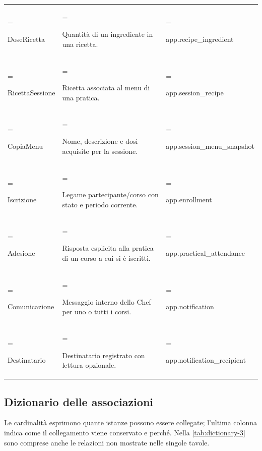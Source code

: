 \documentclass[11pt,a4paper]{article}
\begin{document}
{\begin{xltabular}{\linewidth}{>{\hsize\linewidth=\hsize\raggedright\arraybackslash}X>{\hsize\linewidth=\hsize\raggedright\arraybackslash}X>{\hsize\linewidth=\hsize\raggedright\arraybackslash}X}
DoseRicetta & Quantità di un ingrediente in una ricetta. & {\ttfamily\small app.\allowbreak{}recipe\_\allowbreak{}ingredient}\\\addlinespace[3pt]

RicettaSessione & Ricetta associata al menu di una pratica. & {\ttfamily\small app.\allowbreak{}session\_\allowbreak{}recipe}\\\addlinespace[3pt]

CopiaMenu & Nome, descrizione e dosi acquisite per la sessione. & {\ttfamily\small app.\allowbreak{}session\_\allowbreak{}menu\_\allowbreak{}snapshot}\\\addlinespace[3pt]

Iscrizione & Legame partecipante/corso con stato e periodo corrente. & {\ttfamily\small app.\allowbreak{}enrollment}\\\addlinespace[3pt]

Adesione & Risposta esplicita alla pratica di un corso a cui si è iscritti. & {\ttfamily\small app.\allowbreak{}practical\_\allowbreak{}attendance}\\\addlinespace[3pt]

Comunicazione & Messaggio interno dello Chef per uno o tutti i corsi. & {\ttfamily\small app.\allowbreak{}notification}\\\addlinespace[3pt]

Destinatario & Destinatario registrato con lettura opzionale. & {\ttfamily\small app.\allowbreak{}notification\_\allowbreak{}recipient}\\*

\end{xltabular}}

\subsection{Dizionario delle associazioni}

Le cardinalità esprimono quante istanze possono essere collegate; l’ultima colonna indica come il collegamento viene conservato e perché. Nella \cref{tab:dictionary-3} sono comprese anche le relazioni non mostrate nelle singole tavole.
\end{document}
